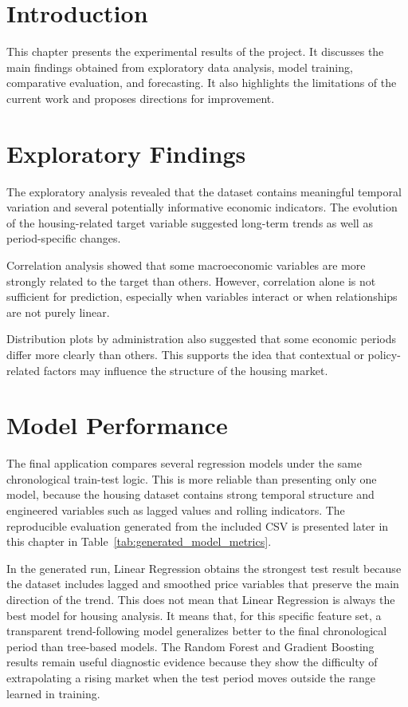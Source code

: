
\section{Introduction}

This chapter presents the experimental results of the project.
It discusses the main findings obtained from exploratory data analysis, model training, comparative evaluation, and forecasting.
It also highlights the limitations of the current work and proposes directions for improvement.

\section{Exploratory Findings}

The exploratory analysis revealed that the dataset contains meaningful temporal variation and several potentially informative economic indicators.
The evolution of the housing-related target variable suggested long-term trends as well as period-specific changes.

Correlation analysis showed that some macroeconomic variables are more strongly related to the target than others.
However, correlation alone is not sufficient for prediction, especially when variables interact or when relationships are not purely linear.

Distribution plots by administration also suggested that some economic periods differ more clearly than others.
This supports the idea that contextual or policy-related factors may influence the structure of the housing market.

\section{Model Performance}

The final application compares several regression models under the same chronological train-test logic.
This is more reliable than presenting only one model, because the housing dataset contains strong temporal structure and engineered variables such as lagged values and rolling indicators.
The reproducible evaluation generated from the included CSV is presented later in this chapter in Table~\ref{tab:generated_model_metrics}.

In the generated run, Linear Regression obtains the strongest test result because the dataset includes lagged and smoothed price variables that preserve the main direction of the trend.
This does not mean that Linear Regression is always the best model for housing analysis.
It means that, for this specific feature set, a transparent trend-following model generalizes better to the final chronological period than tree-based models.
The Random Forest and Gradient Boosting results remain useful diagnostic evidence because they show the difficulty of extrapolating a rising market when the test period moves outside the range learned in training.

